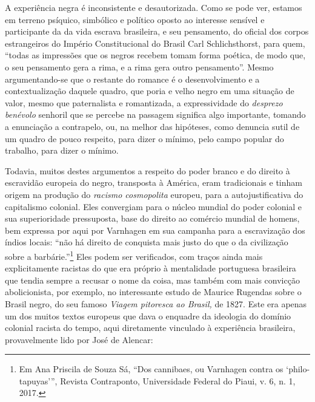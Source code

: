 A experiência negra é inconsistente e desautorizada. Como se pode ver,
estamos em terreno psíquico, simbólico e político oposto ao interesse
sensível e participante da da vida escrava brasileira, e seu pensamento,
do oficial dos corpos estrangeiros do Império Constitucional do Brasil
Carl Schlichsthorst, para quem, ``todas as impressões que os negros
recebem tomam forma poética, de modo que, o seu pensamento gera a rima,
e a rima gera outro pensamento''. Mesmo argumentando-se que o restante
do romance é o desenvolvimento e a contextualização daquele quadro, que
poria e velho negro em uma situação de valor, mesmo que paternalista e
romantizada, a expressividade do \emph{desprezo benévolo} senhoril que
se percebe na passagem significa algo importante, tomando a enunciação a
contrapelo, ou, na melhor das hipóteses, como denuncia sutil de um
quadro de pouco respeito, para dizer o mínimo, pelo campo popular do
trabalho, para dizer o mínimo.

Todavia, muitos destes argumentos a respeito do poder branco e do
direito à escravidão europeia do negro, transposta à América, eram
tradicionais e tinham origem na produção do \emph{racismo cosmopolita}
europeu, para a autojustificativa do capitalismo colonial. Eles
convergiam para o núcleo mundial do poder colonial e sua superioridade
pressuposta, base do direito ao comércio mundial de homens, bem expressa
por aqui por Varnhagen em sua campanha para a escravização dos índios
locais: ``não há direito de conquista mais justo do que o da civilização
sobre a barbárie.''\footnote{Em Ana Priscila de Souza Sá, ``Dos
  cannibaes, ou Varnhagen contra os `philo-tapuyas''', Revista
  Contraponto, Universidade Federal do Piaui, v. 6, n. 1, 2017.} Eles
podem ser verificados, com traços ainda mais explicitamente racistas do
que era próprio à mentalidade portuguesa brasileira que tendia sempre a
recusar o nome da coisa, mas também com mais convicção abolicionista,
por exemplo, no interessante estudo de Maurice Rugendas sobre o Brasil
negro, do seu famoso \emph{Viagem pitoresca ao Brasil,} de 1827. Este
era apenas um dos muitos textos europeus que dava o enquadre da
ideologia do domínio colonial racista do tempo, aqui diretamente
vinculado à experiência brasileira, provavelmente lido por José de
Alencar:

